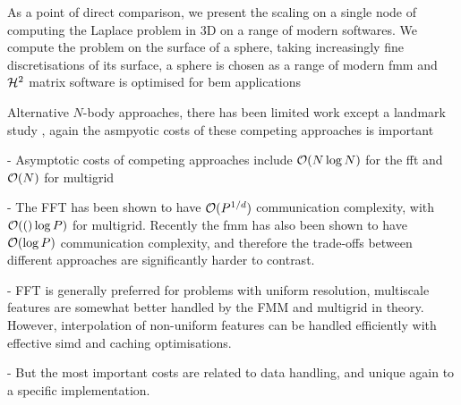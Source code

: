 As a point of direct comparison, we present the scaling on a single node of computing the Laplace problem in 3D on a range of modern softwares. We compute the problem on the surface of a sphere, taking increasingly fine discretisations of its surface, a sphere is chosen as a range of modern \acrshort{fmm} and $\mathcal{H}^2$ matrix software is optimised for \acrfull{bem} applications

Alternative $N$-body approaches, there has been limited work except a landmark study \cite{gholami2016fft}, again the asmpyotic costs of these competing approaches is important

- Asymptotic costs of competing approaches include $\mathcal{O}(N \log{N})$ for the \acrshort{fft} and $\mathcal{O}(N)$ for multigrid

- The FFT has been shown to have $\mathcal{O}(P^{1/d})$ communication complexity, with $\mathcal{O}(()\log{P})$ for multigrid. Recently the \acrshort{fmm} has also been shown to have $\mathcal{O}(\log{P})$ communication complexity, and therefore the trade-offs between different approaches are significantly harder to contrast.

- FFT is generally preferred for problems with uniform resolution, multiscale features are somewhat better handled by the FMM and multigrid in theory. However, interpolation of non-uniform features can be handled efficiently with effective \acrshort{simd} and caching optimisations.

- But the most important costs are related to data handling, and unique again to a specific implementation.